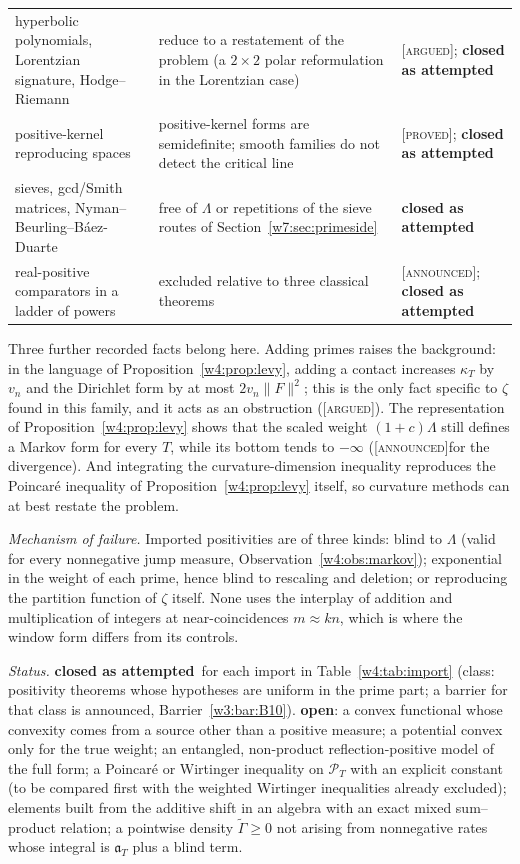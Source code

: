 \documentclass[11pt]{amsart}
\theoremstyle{definition}
\theoremstyle{remark}
\numberwithin{equation}{section}
\newcommand{\PT}{\mathcal{P}_T}                        %
\newcommand{\aT}{\mathfrak{a}_T}                       %
\newcommand{\stag}[1]{\textsc{[#1]}}
\newcommand{\PROVED}{\stag{proved}}
\newcommand{\ARGUED}{\stag{argued}}
\newcommand{\ANNOUNCED}{\stag{announced}}
\newcommand{\rtag}[1]{\textbf{\small\textsf{#1}}}
\newcommand{\closedA}{\rtag{closed as attempted}}
\newcommand{\openR}{\rtag{open}}
\newcommand{\entry}[1]{\par\smallskip\noindent\textit{#1.}\enspace}
\begin{document}
\begin{table}[htbp]
\begin{tabular}{@{}p{3.6cm}p{7.4cm}p{2.8cm}@{}}
hyperbolic polynomials, Lorentzian signature, Hodge--Riemann & reduce to a restatement of the problem (a $2\times2$ polar reformulation in the Lorentzian case) & \ARGUED; \closedA\\
positive-kernel reproducing spaces & positive-kernel forms are semidefinite; smooth families do not detect the critical line \cite[Theorems~5.1--5.3]{P18} & \PROVED; \closedA\\
sieves, gcd/Smith matrices, Nyman--Beurling--B\'aez-Duarte & free of $\Lambda$ or repetitions of the sieve routes of Section~\ref{w7:sec:primeside} & \closedA\\
real-positive comparators in a ladder of powers & excluded relative to three classical theorems & \ANNOUNCED; \closedA\\
\bottomrule
\end{tabular}
\end{table}

Three further recorded facts belong here. Adding primes raises the background: in the language of
Proposition~\ref{w4:prop:levy}, adding a contact increases $\kappa_T$ by $v_n$ and the Dirichlet form by at most $2v_n\|F\|^2$; this
is the only fact specific to $\zeta$ found in this family, and it acts as an obstruction (\ARGUED). The representation of
Proposition~\ref{w4:prop:levy} shows that the scaled weight $(1+c)\Lambda$ still defines a Markov form for every $T$, while its bottom
tends to $-\infty$ (\ANNOUNCED for the divergence). And integrating the curvature-dimension inequality reproduces the Poincar\'e
inequality of Proposition~\ref{w4:prop:levy} itself, so curvature methods can at best restate the problem.

\entry{Mechanism of failure} Imported positivities are of three kinds: blind to $\Lambda$ (valid for every nonnegative jump measure,
Observation~\ref{w4:obs:markov}); exponential in the weight of each prime, hence blind to rescaling and deletion; or reproducing the
partition function of $\zeta$ itself. None uses the interplay of addition and multiplication of integers at near-coincidences
$m\approx kn$, which is where the window form differs from its controls.

\entry{Status} \closedA\ for each import in Table~\ref{w4:tab:import} (class: positivity theorems whose hypotheses are uniform in the
prime part; a barrier for that class is announced, Barrier~\ref{w3:bar:B10}). \openR: a convex functional whose convexity comes from a
source other than a positive measure; a potential convex only for the true weight; an entangled, non-product reflection-positive model of
the full form; a Poincar\'e or Wirtinger inequality on $\PT$ with an explicit constant (to be compared first with the weighted Wirtinger
inequalities already excluded); elements built from the additive shift in an algebra with an exact mixed sum--product relation; a pointwise
density $\tilde\Gamma\ge0$ not arising from nonnegative rates whose integral is $\aT$ plus a blind term.
\end{document}
